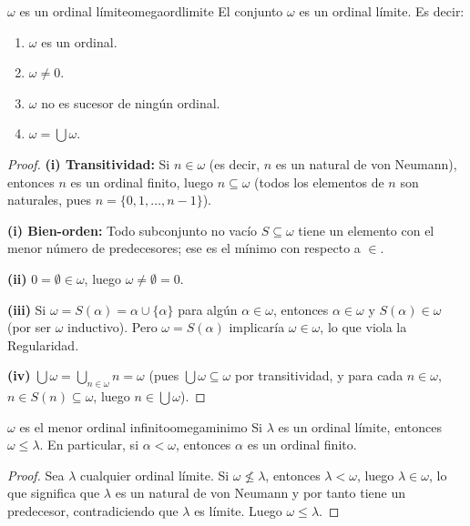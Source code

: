 \begin{teorema}{$\omega$ es un ordinal límite}{omegaordlimite}
El conjunto $\omega$ es un ordinal límite. Es decir:
\begin{enumerate}[leftmargin=2em, label=(\roman*)]
  \item $\omega$ es un ordinal.
  \item $\omega \neq 0$.
  \item $\omega$ no es sucesor de ningún ordinal.
  \item $\omega = \bigcup \omega$.
\end{enumerate}
\end{teorema}

\begin{proof}
\textbf{(i) Transitividad:} Si $n \in \omega$ (es decir, $n$ es un natural de von Neumann), entonces $n$ es un ordinal finito, luego $n \subseteq \omega$ (todos los elementos de $n$ son naturales, pues $n = \{0,1,\ldots,n-1\}$).

\textbf{(i) Bien-orden:} Todo subconjunto no vacío $S \subseteq \omega$ tiene un elemento con el menor número de predecesores; ese es el mínimo con respecto a $\in$.

\textbf{(ii)} $0 = \emptyset \in \omega$, luego $\omega \neq \emptyset = 0$.

\textbf{(iii)} Si $\omega = S(\alpha) = \alpha \cup \{\alpha\}$ para algún $\alpha \in \omega$, entonces $\alpha \in \omega$ y $S(\alpha) \in \omega$ (por ser $\omega$ inductivo). Pero $\omega = S(\alpha)$ implicaría $\omega \in \omega$, lo que viola la Regularidad.

\textbf{(iv)} $\bigcup \omega = \bigcup_{n \in \omega} n = \omega$ (pues $\bigcup \omega \subseteq \omega$ por transitividad, y para cada $n \in \omega$, $n \in S(n) \subseteq \omega$, luego $n \in \bigcup \omega$).
\end{proof}

\begin{proposicion}{$\omega$ es el menor ordinal infinito}{omegaminimo}
Si $\lambda$ es un ordinal límite, entonces $\omega \leq \lambda$. En particular, si $\alpha < \omega$, entonces $\alpha$ es un ordinal finito.
\end{proposicion}

\begin{proof}
Sea $\lambda$ cualquier ordinal límite. Si $\omega \not\leq \lambda$, entonces $\lambda < \omega$, luego $\lambda \in \omega$, lo que significa que $\lambda$ es un natural de von Neumann y por tanto tiene un predecesor, contradiciendo que $\lambda$ es límite. Luego $\omega \leq \lambda$.
\end{proof}

